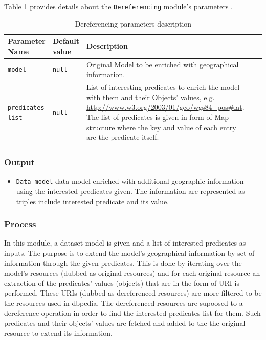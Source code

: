 \documentclass[a4paper,twoside,bibtotoc,abstracton,12pt,BCOR=15mm]{article}
\begin{document}
Table \ref{tbl:derefPram} provides details about the \texttt{Dereferencing} module's parameters .

\begin{table}[ht]
\caption{Dereferencing parameters description} \label{tbl:derefPram}
\begin{tabular}{@{}  l  l p{7cm} l p{6cm}@{}}
\toprule
\textbf{Parameter Name} & \textbf{Default value} & \textbf{Description}\\
\midrule
\texttt{model}	& \texttt{null} 	& Original Model to be enriched with geographical information.\\
\texttt{predicates list} 	& \texttt{null} 	& List of interesting predicates to enrich the model with them and their Objects' values, e.g. \url {http://www.w3.org/2003/01/geo/wgs84_pos#lat}. The list of predicates is given in form of Map structure where the key and value of each entry are the predicate itself. \\
\bottomrule
\end{tabular}
\end{table}

\subsubsection{Output}
\begin{itemize}
 \item \texttt{Data model} data model enriched with additional geographic information using the interested predicates given. The information are represented as triples include interested predicate and its value.
\end{itemize}

\subsubsection{Process}
 In this module, a dataset model is given and a list of interested predicates as inputs. The purpose is to  extend the model's geographical information by set of information through the given predicates. This is done by iterating over the model's resources (dubbed as original resources) and for each original resource an extraction of the predicates' values (objects) that are in the form of URI is performed. These URIs (dubbed as dereferenced resources) are more filtered to be the resources used in dbpedia. The dereferenced resources are supoosed to a dereference operation in order to find the interested predicates list for them. Such predicates and their objects' values are fetched and added to the the original resource to extend its information.
\end{document}
